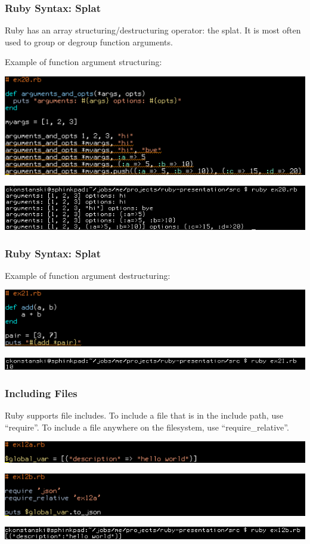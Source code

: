 \documentclass[helvetica,english,utf8,notitle,nologo]{beamer}
\begin{document}
\begin{frame}
  \frametitle{Ruby Syntax: Splat}

  Ruby has an array structuring/destructuring operator: the splat. It
  is most often used to group or degroup function arguments.

  Example of function argument structuring:

  \includegraphics[scale=0.53]{src_20}

  \includegraphics[scale=0.5]{out_20}
\end{frame}

\begin{frame}
  \frametitle{Ruby Syntax: Splat}

  Example of function argument destructuring:

  \includegraphics[scale=0.53]{src_21}

  \includegraphics[scale=0.5]{out_21}
\end{frame}

\begin{frame}
  \frametitle{Including Files}

  Ruby supports file includes. To include a file that is in the
  include path, use ``require''. To include a file anywhere on the
  filesystem, use ``require\_relative''.

  \includegraphics[scale=0.53]{src_12a}

  \includegraphics[scale=0.53]{src_12b}

  \includegraphics[scale=0.5]{out_12}
\end{frame}
\end{document}
